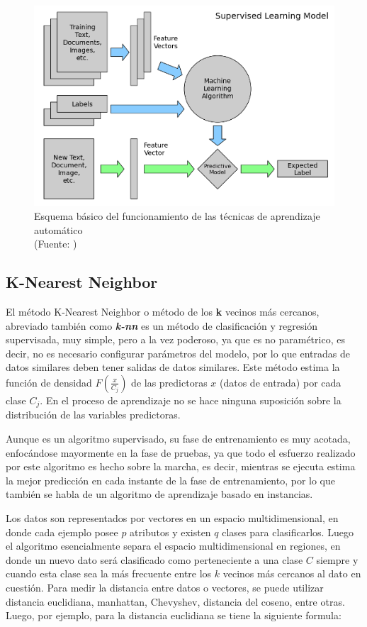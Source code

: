 \begin{figure}[ht!]
\centering
\includegraphics[width=.6\textwidth]{figures/image_machinelearning.png}
\caption[Esquema básico machine learning]{Esquema básico del funcionamiento de las técnicas de aprendizaje automático\\
{\scriptsize (Fuente: \cite{machineLearningBasic})}}
\label{fig:machineLearningBasic}
\end{figure}

\subsection{K-Nearest Neighbor}

El método K-Nearest Neighbor o método de los \textbf{k} vecinos más cercanos, abreviado también como \textbf{\textit{k-nn}} es un método de clasificación y regresión supervisada, muy simple, pero a la vez poderoso, ya que es no paramétrico, es decir, no es necesario configurar parámetros del modelo, por lo que entradas de datos similares deben tener salidas de datos similares. Este método estima la función de densidad $F(\frac{x}{C_{j}})$ de las predictoras $x$ (datos de entrada) por cada clase $C_{j}$. En el proceso de aprendizaje no se hace ninguna suposición sobre la distribución de las variables predictoras.

Aunque es un algoritmo supervisado, su fase de entrenamiento es muy acotada, enfocándose mayormente en la fase de pruebas, ya que todo el esfuerzo realizado por este algoritmo es hecho sobre la marcha, es decir, mientras se ejecuta estima la mejor predicción en cada instante de la fase de entrenamiento, por lo que también se habla de un algoritmo de aprendizaje basado en instancias.

Los datos son representados por vectores en un espacio multidimensional, en donde cada ejemplo posee $p$ atributos y existen $q$ clases para clasificarlos. Luego el algoritmo esencialmente separa el espacio multidimensional en regiones, en donde un nuevo dato será clasificado como perteneciente a una clase $C$ siempre y cuando esta clase sea la más frecuente entre los $k$ vecinos más cercanos al dato en cuestión. Para medir la distancia entre datos o vectores, se puede utilizar distancia euclidiana, manhattan, Chevyshev, distancia del coseno, entre otras. Luego, por ejemplo, para la distancia euclidiana se tiene la siguiente formula:

